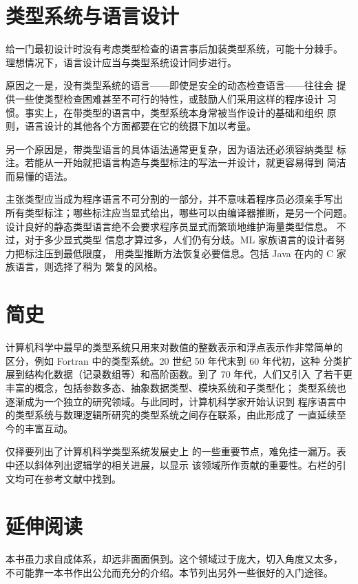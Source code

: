 \section{类型系统与语言设计}

给一门最初设计时没有考虑类型检查的语言事后加装类型系统，可能十分棘手。
理想情况下，语言设计应当与类型系统设计同步进行。

原因之一是，没有类型系统的语言——即使是安全的动态检查语言——往往会
提供一些使类型检查困难甚至不可行的特性，或鼓励人们采用这样的程序设计
习惯。事实上，在带类型的语言中，类型系统本身常被当作设计的基础和组织
原则，语言设计的其他各个方面都要在它的统摄下加以考量。

另一个原因是，带类型语言的具体语法通常更复杂，因为语法还必须容纳类型
标注。若能从一开始就把语言构造与类型标注的写法一并设计，就更容易得到
简洁而易懂的语法。

主张类型应当成为程序语言不可分割的一部分，并不意味着程序员必须亲手写出
所有类型标注；哪些标注应当显式给出，哪些可以由编译器推断，是另一个问题。
设计良好的静态类型语言绝不会要求程序员显式而繁琐地维护海量类型信息。
不过，对于多少显式类型
信息才算过多，人们仍有分歧。ML 家族语言的设计者努力把标注压到最低限度，
用类型推断方法恢复必要信息。包括 Java 在内的 C 家族语言，则选择了稍为
繁复的风格。

\section{简史}

计算机科学中最早的类型系统只用来对数值的整数表示和浮点表示作非常简单的
区分，例如 Fortran 中的类型系统。20 世纪 50 年代末到 60 年代初，这种
分类扩展到结构化数据（记录数组等）和高阶函数。到了 70 年代，人们又引入
了若干更丰富的概念，包括参数多态、抽象数据类型、模块系统和子类型化；
类型系统也逐渐成为一个独立的研究领域。与此同时，计算机科学家开始认识到
程序语言中的类型系统与数理逻辑所研究的类型系统之间存在联系，由此形成了
一直延续至今的丰富互动。

仅择要列出了计算机科学类型系统发展史上
的一些重要节点，难免挂一漏万。表中还以斜体列出逻辑学的相关进展，以显示
该领域所作贡献的重要性。右栏的引文均可在参考文献中找到。


\FloatBarrier

\section{延伸阅读}

本书虽力求自成体系，却远非面面俱到。这个领域过于庞大，切入角度又太多，
不可能靠一本书作出公允而充分的介绍。本节列出另外一些很好的入门途径。

